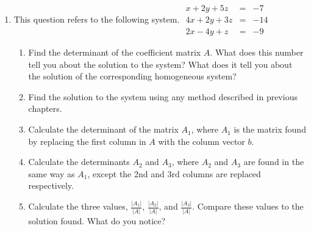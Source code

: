 \begin{enumerate}
\item This question refers to the following system.
$\begin{array}{rrl} x+2y+5z&=&-7\\ 4x+2y+3z&=&-14\\ 2x-4y+z&=&-9
\end{array}$
\begin{enumerate}
\item Find the determinant of the coefficient matrix $A$. What does
this number tell you about the solution to the system? What does
it tell you about the solution of the corresponding homogeneous
system?
\item Find the solution to the system using any method described
in previous chapters.
\item Calculate the determinant of the matrix $A_1$, where $A_1$
is the matrix found by replacing the first column in $A$ with the
column vector $b$.
\item Calculate the determinants $A_2$ and $A_3$, where $A_2$ and
$A_3$ are found in the same way as $A_1$, except the 2nd and 3rd
columns are replaced respectively.
\item Calculate the three values, $\frac{|A_1|}{|A|}$,
$\frac{|A_2|}{|A|}$, and $\frac{|A_3|}{|A|}$. Compare these values
to the solution found. What do you notice?
\end{enumerate}
\end{enumerate}
